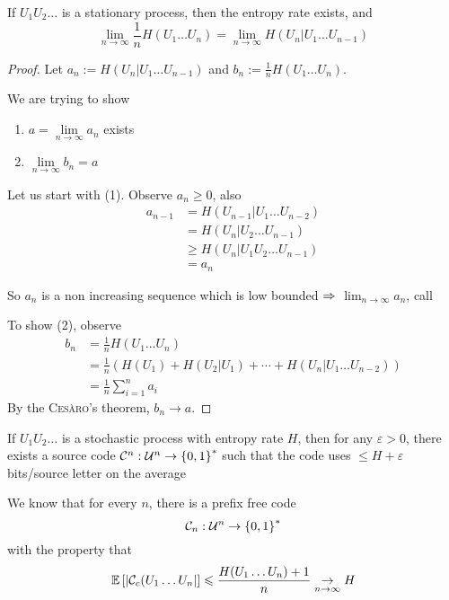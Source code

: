 \begin{theorem}
    If $U_1U_2\ldots$ is a stationary process, then the entropy rate exists, and
    \[
        \lim\limits_{n\to\infty} \frac{1}{n} H(U_1\ldots U_n) = \lim\limits_{n\to\infty} H(U_n \vert U_1\ldots U_{n-1})
    \]
\end{theorem}
\begin{proof}
    Let $a_n := H(U_n \vert U_1 \ldots U_{n-1})$ and $b_n := \frac{1}{n} H(U_1 \ldots U_n)$.
    
    We are trying to show
    \begin{enumerate}
        \item $a = \lim\limits_{n\to\infty} a_n$ exists
        \item $\lim\limits_{n\to\infty} b_n = a$
    \end{enumerate}
    
    Let us start with (1). Observe $a_n \geqslant 0$, also
    \[
        \begin{aligned}
            a_{n-1} &= H(U_{n-1} \vert U_1 \ldots U_{n-2})\\
            &= H(U_n \vert U_2 \ldots U_{n-1})\\
            &\geqslant H(U_n \vert U_1 U_2\ldots U_{n-1})\\
            &= a_n
        \end{aligned}            
    \]
    
    So $a_n$ is a non increasing sequence which is low bounded $\Rightarrow$ $\lim_{n\to\infty} a_n$, call
    
    To show (2), observe
    \[
        \begin{aligned}
            b_n &= \frac{1}{n} H(U_1\ldots U_n)\\
            &= \frac{1}{n} \left( H(U_1)+H(U_2 \vert U_1) + \cdots + H(U_n \vert U_1\ldots U_{n-2}) \right)\\
            &= \frac{1}{n} \sum\limits_{i=1}^n a_i
        \end{aligned}
    \]
    By the \textsc{Cesàro}'s theorem, $b_n\to a$.
\end{proof}

\begin{theorem}
    If $U_1U_2\ldots$ is a stochastic process with entropy rate $H$, then for any $\varepsilon > 0$, there exists a source code $\mathcal{C}^n : \mathcal{U}^n \to \left\{ 0,1 \right\}^*$ such that the code uses $ \leqslant H + \varepsilon$ bits/source letter on the average
\end{theorem}

We know that for every $n$, there is a prefix free code
\[
    \mathcal{C}_n: \mathcal{U}^n \to \left\{ 0,1 \right\}^*
\]
with the property that
\[
    \mathbb{E}\left[ \left\lvert\mathcal{C}_c(U_1\ldots U_n\right\rvert \right] \leqslant \frac{H(U_1\ldots U_n)+1}{n} \underset{n \to \infty}{\to   } H
\]

